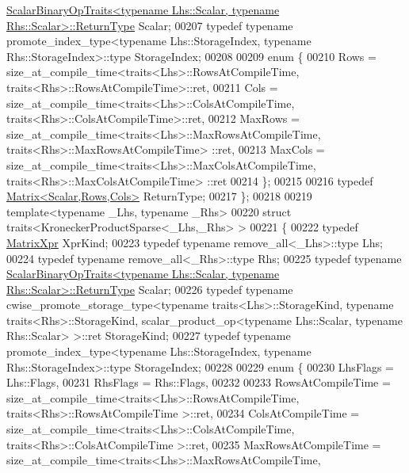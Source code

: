\begin{DoxyCode}
      \hyperlink{group___core___module_struct_eigen_1_1_scalar_binary_op_traits}{ScalarBinaryOpTraits<typename Lhs::Scalar, typename Rhs::Scalar>::ReturnType}
       Scalar;
00207   \textcolor{keyword}{typedef} \textcolor{keyword}{typename} promote\_index\_type<typename Lhs::StorageIndex, typename Rhs::StorageIndex>::type 
      StorageIndex;
00208 
00209   \textcolor{keyword}{enum} \{
00210     Rows = size\_at\_compile\_time<traits<Lhs>::RowsAtCompileTime, traits<Rhs>::RowsAtCompileTime>::ret,
00211     Cols = size\_at\_compile\_time<traits<Lhs>::ColsAtCompileTime, traits<Rhs>::ColsAtCompileTime>::ret,
00212     MaxRows = size\_at\_compile\_time<traits<Lhs>::MaxRowsAtCompileTime, traits<Rhs>::MaxRowsAtCompileTime>
      ::ret,
00213     MaxCols = size\_at\_compile\_time<traits<Lhs>::MaxColsAtCompileTime, traits<Rhs>::MaxColsAtCompileTime>
      ::ret
00214   \};
00215 
00216   \textcolor{keyword}{typedef} \hyperlink{group___core___module_class_eigen_1_1_matrix}{Matrix<Scalar,Rows,Cols>} ReturnType;
00217 \};
00218 
00219 \textcolor{keyword}{template}<\textcolor{keyword}{typename} \_Lhs, \textcolor{keyword}{typename} \_Rhs>
00220 \textcolor{keyword}{struct }traits<KroneckerProductSparse<\_Lhs,\_Rhs> >
00221 \{
00222   \textcolor{keyword}{typedef} \hyperlink{struct_eigen_1_1_matrix_xpr}{MatrixXpr} XprKind;
00223   \textcolor{keyword}{typedef} \textcolor{keyword}{typename} remove\_all<\_Lhs>::type Lhs;
00224   \textcolor{keyword}{typedef} \textcolor{keyword}{typename} remove\_all<\_Rhs>::type Rhs;
00225   \textcolor{keyword}{typedef} \textcolor{keyword}{typename} 
      \hyperlink{group___core___module_struct_eigen_1_1_scalar_binary_op_traits}{ScalarBinaryOpTraits<typename Lhs::Scalar, typename Rhs::Scalar>::ReturnType}
       Scalar;
00226   \textcolor{keyword}{typedef} \textcolor{keyword}{typename} cwise\_promote\_storage\_type<typename traits<Lhs>::StorageKind, \textcolor{keyword}{typename} 
      traits<Rhs>::StorageKind, scalar\_product\_op<typename Lhs::Scalar, typename Rhs::Scalar> >::ret StorageKind;
00227   \textcolor{keyword}{typedef} \textcolor{keyword}{typename} promote\_index\_type<typename Lhs::StorageIndex, typename Rhs::StorageIndex>::type 
      StorageIndex;
00228 
00229   \textcolor{keyword}{enum} \{
00230     LhsFlags = Lhs::Flags,
00231     RhsFlags = Rhs::Flags,
00232 
00233     RowsAtCompileTime = size\_at\_compile\_time<traits<Lhs>::RowsAtCompileTime, traits<Rhs>::RowsAtCompileTime
      >::ret,
00234     ColsAtCompileTime = size\_at\_compile\_time<traits<Lhs>::ColsAtCompileTime, traits<Rhs>::ColsAtCompileTime
      >::ret,
00235     MaxRowsAtCompileTime = size\_at\_compile\_time<traits<Lhs>::MaxRowsAtCompileTime, 

\end{DoxyCode}
